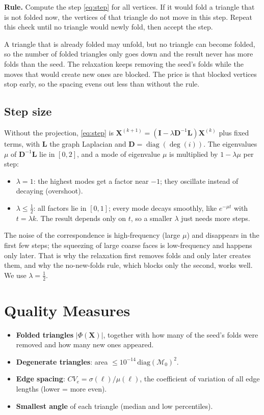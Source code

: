 \documentclass[11pt,a4paper]{article}
\newcommand{\Fine}{\mathcal{M}_0}
\newcommand{\X}{\mathbf{X}}
\begin{document}
\textbf{Rule.} Compute the step \eqref{eq:step} for all vertices. If it would fold a triangle that is not folded now, the vertices of that triangle do not move in this step. Repeat this check until no triangle would newly fold, then accept the step.

A triangle that is already folded may unfold, but no triangle can become folded, so the number of folded triangles only goes down and the result never has more folds than the seed. The relaxation keeps removing the seed's folds while the moves that would create new ones are blocked. The price is that blocked vertices stop early, so the spacing evens out less than without the rule.

\subsection{Step size}
Without the projection, \eqref{eq:step} is $\X^{(k+1)} = (\mathbf{I} - \lambda \mathbf{D}^{-1}\mathbf{L}) \X^{(k)}$ plus fixed terms, with $\mathbf{L}$ the graph Laplacian and $\mathbf{D} = \operatorname{diag}(\deg(i))$. The eigenvalues $\mu$ of $\mathbf{D}^{-1}\mathbf{L}$ lie in $[0, 2]$, and a mode of eigenvalue $\mu$ is multiplied by $1 - \lambda\mu$ per step:
\begin{itemize}
    \item $\lambda = 1$: the highest modes get a factor near $-1$; they oscillate instead of decaying (overshoot).
    \item $\lambda \le \frac12$: all factors lie in $[0, 1]$; every mode decays smoothly, like $e^{-\mu t}$ with $t = \lambda k$. The result depends only on $t$, so a smaller $\lambda$ just needs more steps.
\end{itemize}
The noise of the correspondence is high-frequency (large $\mu$) and disappears in the first few steps; the squeezing of large coarse faces is low-frequency and happens only later. That is why the relaxation first removes folds and only later creates them, and why the no-new-folds rule, which blocks only the second, works well. We use $\lambda = \frac12$.

\section{Quality Measures}
\begin{itemize}
    \item \textbf{Folded triangles} $|\Phi(\X)|$, together with how many of the seed's folds were removed and how many new ones appeared.
    \item \textbf{Degenerate triangles}: area $\le 10^{-14}\,\text{diag}(\Fine)^2$.
    \item \textbf{Edge spacing}: $CV_e = \sigma(\ell)/\mu(\ell)$, the coefficient of variation of all edge lengths (lower = more even).
    \item \textbf{Smallest angle} of each triangle (median and low percentiles).
\end{itemize}
\end{document}
